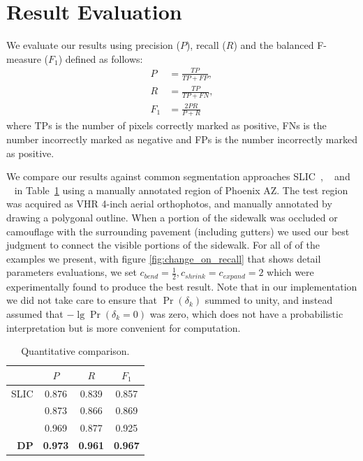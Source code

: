 \section{Result Evaluation}

We evaluate our results using precision ($P$), recall ($R$) and the balanced F-measure ($F_1$) defined as follows:
\begin{align}
     P &= \frac{\mathit{TP}}{\mathit{TP} + \mathit{FP}}, \\
     R &= \frac{\mathit{TP}}{\mathit{TP} + \mathit{FN}}, \\  
     F_1 &= \frac{2 P R}{P + R}
\end{align}
where 
\acp{TP} is the number of pixels correctly marked as positive, 
\acp{FN} is the number incorrectly marked as negative and 
\acp{FP} is the number incorrectly marked as positive. 

We compare our results against common segmentation approaches 
\ac{SLIC}~\cite{Achanta:149300}, \ActiveContours{}~\cite{ActiveContou09} and \GrabCut{}~\cite{Rother2004-ou} 
in Table~\ref{tab:quantitative-against-common} using a manually annotated region of 
Phoenix AZ. The test region was acquired as \ac{VHR} 4-inch aerial orthophotos, 
and manually annotated by drawing a polygonal outline. 
When a portion of the sidewalk was occluded or camouflage with the surrounding pavement 
(including gutters) we used our best judgment to connect the visible portions of the sidewalk. For all of of the examples we present, with figure \ref{fig:change_on_recall} that shows detail parameters evaluations, we set $c_\mathit{bend}=\frac{1}{2}, c_\mathit{shrink}=c_\mathit{expand}=2$ which were experimentally found to produce the best result. Note that in our implementation we did not take care to ensure that $\Pr(\delta_k)$ summed to unity, and instead assumed that $-\lg \Pr(\delta_k=0)$ was zero, which does not have a probabilistic interpretation but is more convenient for computation. 

\begin{table}[h!]
    \caption{Quantitative comparison. }
    \label{tab:quantitative-against-common}
    \centering
    \begin{tabular}{r ccc}
                            & $P$ & $R$& $F_1$ \\ 
                                 \hline 
                  \ac{SLIC} & 0.876 & 0.839 & 0.857 \\
          \ActiveContours{} & 0.873 & 0.866 & 0.869  \\
                 \GrabCut{} & 0.969 & 0.877 & 0.925  \\ 
                                 \hline
                \textbf{DP} & \textbf{0.973} & \textbf{0.961} & \textbf{0.967}   
    \end{tabular}
\end{table}


